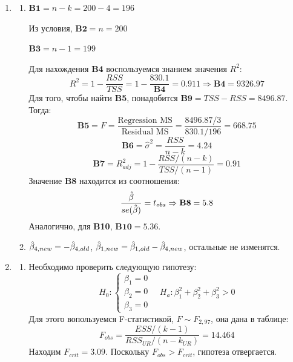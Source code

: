 \documentclass[12pt, a4paper]{article}
\begin{document}
\begin{enumerate}
\item
\begin{enumerate}
  \item
$\textbf{B1} = n - k = 200 - 4 = 196$

Из условия, $\textbf{B2} = n = 200$

$\textbf{B3} = n - 1  = 199$

Для нахождения \textbf{B4} воспользуемся знанием значения $R^2$:
\[
R^2 = 1 - \frac{RSS}{TSS} = 1 - \frac{830.1}{\textbf{B4}} = 0.911 \Rightarrow \textbf{B4} = 9326.97
\]
Для того, чтобы найти \textbf{B5}, понадобится $\textbf{B9} = TSS - RSS = 8496.87$. Тогда:
\[
\textbf{B5} = F = \frac{\text{Regression MS}}{\text{Residual MS}} = \frac{8496.87/3}{830.1/196} = 668.75
\]
\[
\textbf{B6} = \hat{\sigma}^2 = \frac{RSS}{n-k} = 4.24
\]
\[
\textbf{B7} = R^2_{adj} = 1 - \frac{RSS/(n-k)}{TSS/(n-1)} = 0.91
\]
Значение \textbf{B8} находится из соотношения:
\[
\frac{\hat{\beta}}{se(\hat{\beta})} = t_{obs} \Rightarrow \textbf{B8} = 5.8
\]
Аналогично, для \textbf{B10}, $\textbf{B10} = 5.36$.

\item  $\hat{\beta}_{4, new} = -\hat{\beta}_{4, old}$, $\hat{\beta}_{1, new} = \hat{\beta}_{1, old} - \hat{\beta}_{4, new}$, остальные не изменятся.
\end{enumerate}
\item
\begin{enumerate}
\item Необходимо проверить следующую гипотезу:
\[
H_0: \begin{cases}
\beta_1 = 0 \\
\beta_2 = 0 \\
\beta_3 = 0
\end{cases}
\quad
H_a: \beta_1^2 + \beta_2^2 + \beta_3^2 >0
\]
Для этого вопользуемся F-статистикой, $F \sim F_{2,97}$, она дана в таблице:
\[
F_{obs} = \frac{ESS/(k-1)}{RSS_{UR}/(n-k_{UR})} = 14.464
\]
Находим $F_{crit} = 3.09$. Поскольку $F_{obs} > F_{crit}$, гипотеза отвергается.


\end{enumerate}
\end{enumerate}
\end{document}
